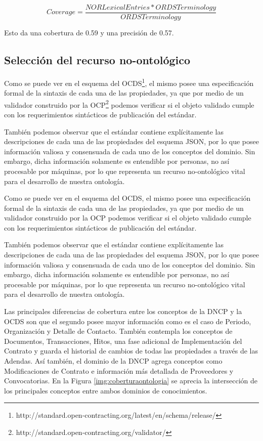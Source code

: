 \begin{equation}
    \label{eq:2}
     Coverage = \frac{{NORLexicalEntries}* {ORDSTerminology}}{{ORDSTerminology}}   
\end{equation}

Esto da una cobertura de 0.59 y una precisión de 0.57. 

\subsection{Selección del recurso no-ontológico}

Como se puede ver en el esquema del OCDS\footnote{http://standard.open-contracting.org/latest/en/schema/release/}, el mismo posee una especificación formal de la sintaxis de cada una de las propiedades, ya que por medio de un validador construido por la OCP\footnote{http://standard.open-contracting.org/validator/} podemos verificar si el objeto validado cumple con los requerimientos sintácticos de publicación del estándar.

También podemos observar que el estándar contiene explícitamente las descripciones de cada una de las propiedades del esquema JSON, por lo que posee información valiosa y consensuada de cada uno de los conceptos del dominio. Sin embargo, dicha información solamente es entendible por personas, no así procesable por máquinas, por lo que representa un recurso no-ontológico vital para el desarrollo de nuestra ontología.

Como se puede ver en el esquema del OCDS, el mismo posee una especificación formal de la sintaxis de cada una de las propiedades, ya que por medio de un validador construido por la OCP podemos verificar si el objeto validado cumple con los requerimientos sintácticos de publicación del estándar.

También podemos observar que el estándar contiene explícitamente las descripciones de cada una de las propiedades del esquema JSON, por lo que posee información valiosa y consensuada de cada uno de los conceptos del dominio. Sin embargo, dicha información solamente es entendible por personas, no así procesable por máquinas, por lo que representa un recurso no-ontológico vital para el desarrollo de nuestra ontología.



Las principales diferencias de cobertura entre los conceptos de la DNCP y la OCDS son que el segundo posee mayor información como es el caso de Periodo, Organización y Detalle de Contacto. También contempla los conceptos de Documentos, Transacciones, Hitos, una fase adicional de Implementación del Contrato y guarda el historial de cambios de todas las propiedades a través de las Adendas. Así también, el dominio de la DNCP agrega conceptos como Modificaciones de Contrato e información más detallada de Proveedores y Convocatorias. En la Figura \ref{img:coberturaontologia} se aprecia la intersección de los principales conceptos entre ambos dominios de conocimientos.

